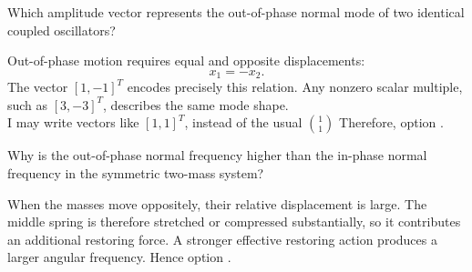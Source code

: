 \begin{quizquestion}[
  id=phy104-nm-008,
  topic=normal-modes,
  difficulty=foundation,
  marks=1,
  correct=D,
  tags={coupled-oscillators,out-of-phase,eigenvector},
  outcome={Recognise an out-of-phase mode vector}
]
  Which amplitude vector represents the out-of-phase normal mode of two identical coupled oscillators?
\end{quizquestion}
\begin{quizsolution}
  Out-of-phase motion requires equal and opposite displacements:
    \[
      x_1=-x_2.
    \]
    The vector \({[1,-1]}^T\) encodes precisely this relation. Any nonzero scalar multiple, such as \({[3,-3]}^T\), describes the same mode shape.\\
    I may write vectors like \({[1, 1]}^T\), instead of the usual \({\displaystyle{\binom{1}{1}}}\) Therefore, option \textbf{\quizcorrectletter}.
\end{quizsolution}

\begin{quizquestion}[
  id=phy104-nm-009,
  topic=normal-modes,
  difficulty=foundation,
  marks=1,
  correct=C,
  tags={coupled-oscillators,out-of-phase,coupling-spring},
  outcome={Explain the higher out-of-phase frequency}
]
  Why is the out-of-phase normal frequency higher than the in-phase normal frequency in the symmetric two-mass system?
\end{quizquestion}
\begin{quizsolution}
  When the masses move oppositely, their relative displacement is large. The middle spring is therefore stretched or compressed substantially, so it contributes an additional restoring force. A stronger effective restoring action produces a larger angular frequency. Hence option \textbf{\quizcorrectletter}.
\end{quizsolution}

